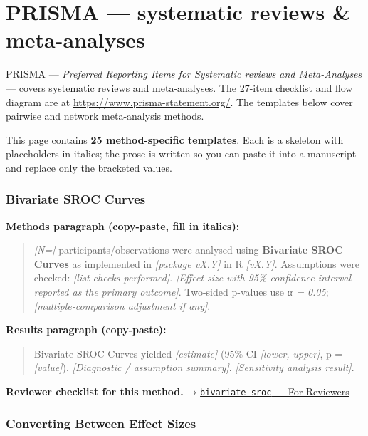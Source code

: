 \documentclass[
]{article}
\author{}
\date{\vspace{-2.5em}}
\begin{document}
\section{PRISMA --- systematic reviews \&
meta-analyses}\label{prisma-systematic-reviews-meta-analyses}

PRISMA --- \emph{Preferred Reporting Items for Systematic reviews and
Meta-Analyses} --- covers systematic reviews and meta-analyses. The
27-item checklist and flow diagram are at
\url{https://www.prisma-statement.org/}. The templates below cover
pairwise and network meta-analysis methods.

This page contains \textbf{25 method-specific templates}. Each is a
skeleton with placeholders in italics; the prose is written so you can
paste it into a manuscript and replace only the bracketed values.

\subsubsection{Bivariate SROC Curves}\label{bivariate-sroc-curves}

\textbf{Methods paragraph (copy-paste, fill in italics):}

\begin{quote}
\emph{{[}N={]}} participants/observations were analysed using
\textbf{Bivariate SROC Curves} as implemented in \emph{{[}package
vX.Y{]}} in R \emph{{[}vX.Y{]}}. Assumptions were checked: \emph{{[}list
checks performed{]}}. \emph{{[}Effect size with 95\% confidence interval
reported as the primary outcome{]}}. Two-sided p-values use \emph{α =
0.05}; \emph{{[}multiple-comparison adjustment if any{]}}.
\end{quote}

\textbf{Results paragraph (copy-paste):}

\begin{quote}
Bivariate SROC Curves yielded \emph{{[}estimate{]}} (95\% CI
\emph{{[}lower, upper{]}}, p = \emph{{[}value{]}}). \emph{{[}Diagnostic
/ assumption summary{]}}. \emph{{[}Sensitivity analysis result{]}}.
\end{quote}

\textbf{Reviewer checklist for this method.} →
\href{../chapters/15-metaanalysis/bivariate-sroc.Rmd\#for-reviewers}{\texttt{bivariate-sroc}
--- For Reviewers}

\subsubsection{Converting Between Effect
Sizes}\label{converting-between-effect-sizes}
\end{document}
